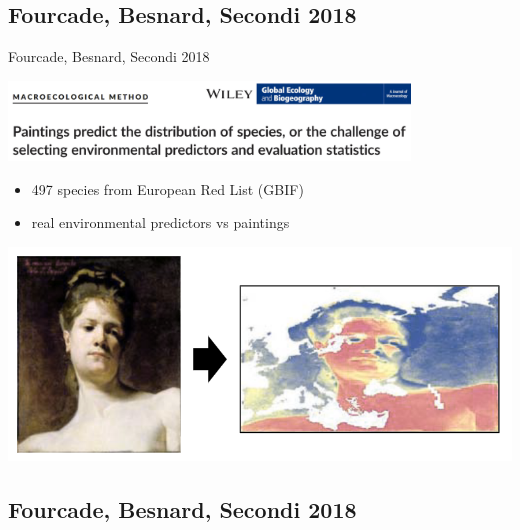 \documentclass[
  ignorenonframetext,
]{beamer}
\providecommand{\tightlist}{%
  \setlength{\itemsep}{0pt}\setlength{\parskip}{0pt}}
\begin{document}
\hypertarget{fourcade-besnard-secondi-2018}{%
\subsection{Fourcade, Besnard, Secondi
2018}\label{fourcade-besnard-secondi-2018}}

\begin{frame}{Fourcade, Besnard, Secondi 2018}
\small

\includegraphics[width=0.8\textwidth,height=\textheight]{paint_header.png}

\begin{itemize}
\tightlist
\item
  497 species from European Red List (GBIF)
\item
  real environmental predictors vs paintings
\end{itemize}

\includegraphics{paint_paint.png}
\end{frame}

\hypertarget{fourcade-besnard-secondi-2018-1}{%
\subsection{Fourcade, Besnard, Secondi
2018}\label{fourcade-besnard-secondi-2018-1}}
\end{document}
